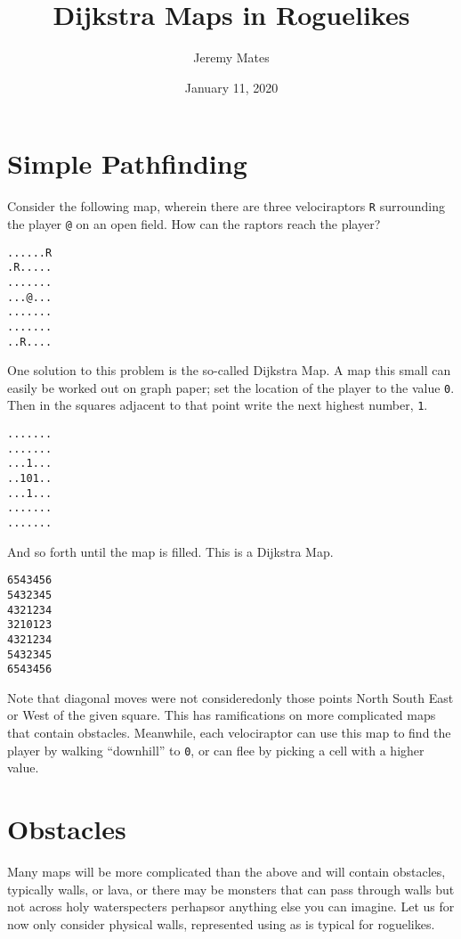 \documentclass[12pt,a4paper]{article}
\title{Dijkstra Maps in Roguelikes}
\author{Jeremy Mates}
\date{January 11, 2020}
\begin{document}

\maketitle

\setlength{\parindent}{0pt}

\section*{Simple Pathfinding}

Consider the following map, wherein there are three velociraptors
\texttt{R} surrounding the player \texttt{@} on an open
field\cite{xkcd135}. How can the raptors reach the player?

\begin{verbatim}
......R
.R.....
.......
...@...
.......
.......
..R....
\end{verbatim}

One solution to this problem is the so-called Dijkstra Map\cite{tipodm}.
A map this small can easily be worked out on graph paper; set the
location of the player to the value \texttt{0}. Then in the squares
adjacent to that point write the next highest number, \texttt{1}.

\begin{verbatim}
.......
.......
...1...
..101..
...1...
.......
.......
\end{verbatim}

And so forth until the map is filled. This is a Dijkstra Map.

\begin{verbatim}
6543456
5432345
4321234
3210123
4321234
5432345
6543456
\end{verbatim}

Note that diagonal moves were not considered\textendash only those
points North South East or West of the given square. This has
ramifications on more complicated maps that contain obstacles.
Meanwhile, each velociraptor can use this map to find the player by
walking ``downhill'' to \texttt{0}, or can flee by picking a cell with a
higher value.

\section*{Obstacles}

Many maps will be more complicated than the above and will contain
obstacles, typically walls, or lava, or there may be monsters that can
pass through walls but not across holy water\textendash specters
perhaps\textendash or anything else you can imagine. Let us for now
only consider physical walls, represented using \texttt{} as
is typical for roguelikes.
\end{document}
